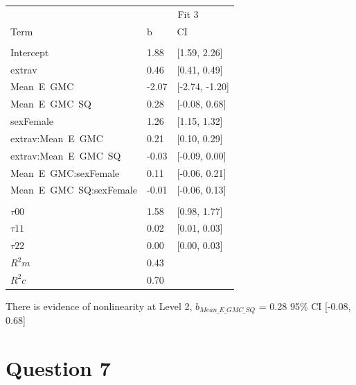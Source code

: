 \documentclass[]{article}
\begin{document}
\begin{tabular}{lll}
\toprule
\multicolumn{1}{c}{ } & \multicolumn{2}{c}{Fit 3} \\
\cmidrule(l{2pt}r{2pt}){2-3}
Term & b & CI\\
\midrule
\addlinespace[0.3em]
\multicolumn{3}{l}{\textbf{Fixed}}\\
\hspace{1em}Intercept & 1.88 & [1.59, 2.26]\\
\hspace{1em}extrav & 0.46 & [0.41, 0.49]\\
\hspace{1em}Mean\ E\ GMC & -2.07 & [-2.74, -1.20]\\
\hspace{1em}Mean\ E\ GMC\ SQ & 0.28 & [-0.08, 0.68]\\
\hspace{1em}sexFemale & 1.26 & [1.15, 1.32]\\
\hspace{1em}extrav:Mean\ E\ GMC & 0.21 & [0.10, 0.29]\\
\hspace{1em}extrav:Mean\ E\ GMC\ SQ & -0.03 & [-0.09, 0.00]\\
\hspace{1em}Mean\ E\ GMC:sexFemale & 0.11 & [-0.06, 0.21]\\
\hspace{1em}Mean\ E\ GMC\ SQ:sexFemale & -0.01 & [-0.06, 0.13]\\
\addlinespace[0.3em]
\multicolumn{3}{l}{\textbf{Random}}\\
\hspace{1em}$\tau {00}$ & 1.58 & [0.98, 1.77]\\
\hspace{1em}$\tau {11}$ & 0.02 & [0.01, 0.03]\\
\hspace{1em}$\tau {22}$ & 0.00 & [0.00, 0.03]\\
$R^2 m$ & 0.43 & \\
$R^2 c$ & 0.70 & \\
\bottomrule
\end{tabular}

There is evidence of nonlinearity at Level 2, \(b_{Mean\_E\_GMC\_SQ}\) =
0.28 95\% CI {[}-0.08, 0.68{]}

\section{Question 7}\label{question-7}
\end{document}
